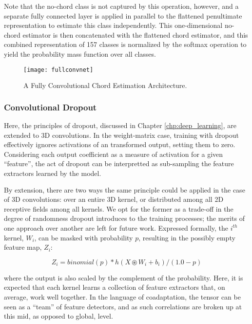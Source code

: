 Note that the no-chord class is not captured by this operation, however, and a separate fully connected layer is applied in parallel to the flattened penultimate representation to estimate this class independently.
This one-dimensional no-chord estimator is then concatenated with the flattened chord estimator, and this combined representation of 157 classes is normalized by the softmax operation to yield the probability mass function over all classes.

\begin{figure}[!t]
\centering
\texttt{[image: fullconvnet]}
\caption{A Fully Convolutional Chord Estimation Architecture.}
\label{fig:fullconvnet}
\end{figure}

\subsubsection{Convolutional Dropout}
\label{subsubsec:conv_dropout}

Here, the principles of dropout, discussed in Chapter \ref{chp:deep_learning}, are extended to 3D convolutions.
In the weight-matrix case, training with dropout effectively ignores activations of an transformed output, setting them to zero.
Considering each output coefficient as a measure of activation for a given ``feature'', the act of dropout can be interpretted as sub-sampling the feature extractors learned by the model.

By extension, there are two ways the same principle could be applied in the case of 3D convolutions: over an entire 3D kernel, or distributed among all 2D receptive fields among all kernels.
We opt for the former as a trade-off in the degree of randomness dropout introduces to the training processes; the merits of one approach over another are left for future work.
Expressed formally, the $i^{th}$ kernel, $W_i$, can be masked with probability $p$, resulting in the possibly empty feature map, $Z_i$:

\begin{equation}
Z_i = binomial(p) * h(X \circledast W_i + b_i) / (1.0 - p)
\end{equation}

\noindent where the output is also scaled by the complement of the probability.
Here, it is expected that each kernel learns a collection of feature extractors that, on average, work well together.
In the language of coadaptation, the tensor can be seen as a ``team'' of feature detectors, and as such correlations are broken up at this mid, as opposed to global, level.

